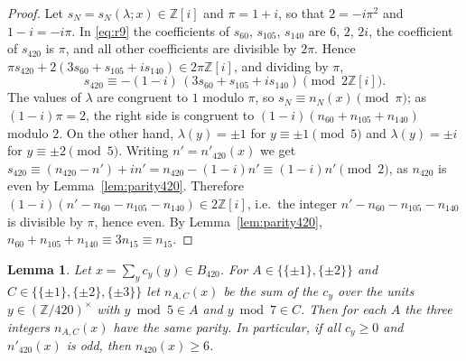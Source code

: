 \documentclass[11pt]{amsart}
\newtheorem{lemma}[theorem]{Lemma}
\theoremstyle{definition}
\theoremstyle{remark}
\numberwithin{equation}{section}
\newcommand{\Z}{\mathbb{Z}}
\begin{document}
\begin{proof}
Let $s_N=s_N(\lambda;x)\in\Z[i]$ and $\pi=1+i$, so that $2=-i\pi^2$ and $1-i=-i\pi$. In \eqref{eq:r9} the coefficients of $s_{60}$, $s_{105}$, $s_{140}$ are $6$, $2$, $2i$, the coefficient of $s_{420}$ is $\pi$, and all other coefficients are divisible by $2\pi$. Hence $\pi s_{420}+2(3s_{60}+s_{105}+is_{140})\in2\pi\Z[i]$, and dividing by $\pi$,
\[
s_{420}\equiv-(1-i)\,(3s_{60}+s_{105}+is_{140})\pmod{2\Z[i]}.
\]
The values of $\lambda$ are congruent to $1$ modulo $\pi$, so $s_N\equiv n_N(x)\pmod\pi$; as $(1-i)\pi=2$, the right side is congruent to $(1-i)(n_{60}+n_{105}+n_{140})$ modulo $2$. On the other hand, $\lambda(y)=\pm1$ for $y\equiv\pm1\pmod5$ and $\lambda(y)=\pm i$ for $y\equiv\pm2\pmod5$. Writing $n'=n'_{420}(x)$ we get $s_{420}\equiv(n_{420}-n')+in'=n_{420}-(1-i)n'\equiv(1-i)n'\pmod2$, as $n_{420}$ is even by Lemma~\ref{lem:parity420}. Therefore $(1-i)(n'-n_{60}-n_{105}-n_{140})\in2\Z[i]$, i.e.\ the integer $n'-n_{60}-n_{105}-n_{140}$ is divisible by $\pi$, hence even. By Lemma~\ref{lem:parity420}, $n_{60}+n_{105}+n_{140}\equiv3n_{15}\equiv n_{15}$.
\end{proof}

\begin{lemma}\label{lem:six420}
Let $x=\sum_yc_y(y)\in B_{420}$. For $A\in\{\{\pm1\},\{\pm2\}\}$ and $C\in\{\{\pm1\},\{\pm2\},\{\pm3\}\}$ let $n_{A,C}(x)$ be the sum of the $c_y$ over the units $y\in(\Z/420)^\times$ with $y\bmod5\in A$ and $y\bmod7\in C$. Then for each $A$ the three integers $n_{A,C}(x)$ have the same parity. In particular, if all $c_y\ge0$ and $n'_{420}(x)$ is odd, then $n_{420}(x)\ge6$.
\end{lemma}
\end{document}
